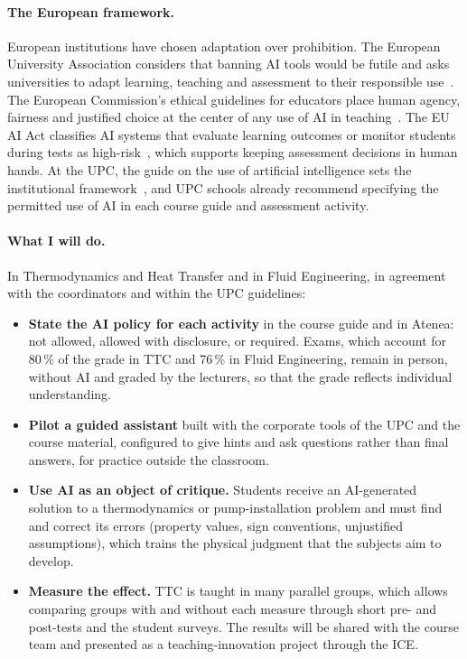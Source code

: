 \documentclass[11pt]{article}
\begin{document}
\paragraph{The European framework.} European institutions have chosen adaptation over
prohibition. The European University Association considers that banning AI tools would be
futile and asks universities to adapt learning, teaching and assessment to their responsible
use~\cite{EUA2023}. The European Commission's ethical guidelines for educators place human
agency, fairness and justified choice at the center of any use of AI in
teaching~\cite{EC2022}. The EU AI Act classifies AI systems that evaluate learning outcomes
or monitor students during tests as high-risk~\cite{AIAct2024}, which supports keeping
assessment decisions in human hands. At the UPC, the guide on the use of artificial
intelligence sets the institutional framework~\cite{UPCAI2026}, and UPC schools already
recommend specifying the permitted use of AI in each course guide and assessment activity.

\paragraph{What I will do.} In Thermodynamics and Heat Transfer and in Fluid Engineering, in
agreement with the coordinators and within the UPC guidelines:
\begin{itemize}
  \item \textbf{State the AI policy for each activity} in the course guide and in Atenea:
  not allowed, allowed with disclosure, or required. Exams, which account for 80\,\% of the
  grade in TTC and 76\,\% in Fluid Engineering, remain in person, without AI and graded by
  the lecturers, so that the grade reflects individual understanding.
  \item \textbf{Pilot a guided assistant} built with the corporate tools of the UPC and the
  course material, configured to give hints and ask questions rather than final answers,
  for practice outside the classroom.
  \item \textbf{Use AI as an object of critique.} Students receive an AI-generated
  solution to a thermodynamics or pump-installation problem and must find and correct its
  errors (property values, sign conventions, unjustified assumptions), which trains the
  physical judgment that the subjects aim to develop.
  \item \textbf{Measure the effect.} TTC is taught in many parallel groups, which allows
  comparing groups with and without each measure through short pre- and post-tests and the
  student surveys. The results will be shared with the course team and presented as a
  teaching-innovation project through the ICE.
\end{itemize}
\end{document}
